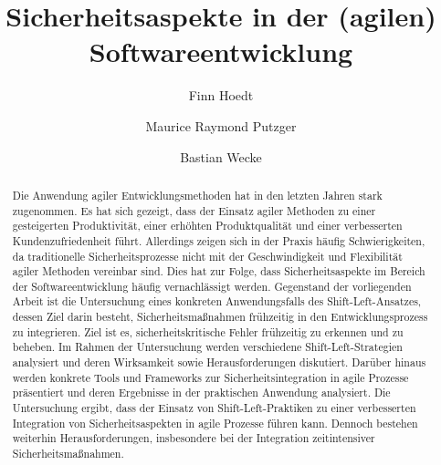 \documentclass[acmtog]{acmart}
\begin{document}
\title{Sicherheitsaspekte in der (agilen) Softwareentwicklung}

\author{Finn Hoedt}
\author{Maurice Raymond Putzger}
\authornotemark[1]
\author{Bastian Wecke}
\authornotemark[1]
\renewcommand{\shortauthors}{Hoedt, Putzger und Wecke}

\begin{abstract}
	Die Anwendung agiler Entwicklungsmethoden hat in den letzten Jahren stark zugenommen. 
	Es hat sich gezeigt, dass der Einsatz agiler Methoden zu einer gesteigerten Produktivität, 
	einer erhöhten Produktqualität und einer verbesserten Kundenzufriedenheit führt. Allerdings zeigen sich in der Praxis häufig Schwierigkeiten, 
	da traditionelle Sicherheitsprozesse nicht mit der Geschwindigkeit und Flexibilität agiler Methoden vereinbar sind. 
	Dies hat zur Folge, dass Sicherheitsaspekte im Bereich der Softwareentwicklung häufig vernachlässigt werden. 
	Gegenstand der vorliegenden Arbeit ist die Untersuchung eines konkreten Anwendungsfalls des Shift-Left-Ansatzes, dessen Ziel darin besteht, 
	Sicherheitsmaßnahmen frühzeitig in den Entwicklungsprozess zu integrieren. Ziel ist es, sicherheitskritische Fehler frühzeitig zu erkennen und zu beheben. 
	Im Rahmen der Untersuchung werden verschiedene Shift-Left-Strategien analysiert und deren Wirksamkeit sowie Herausforderungen diskutiert. 
	Darüber hinaus werden konkrete Tools und Frameworks zur Sicherheitsintegration in agile Prozesse präsentiert und deren Ergebnisse in der praktischen Anwendung analysiert. 
	Die Untersuchung ergibt, dass der Einsatz von Shift-Left-Praktiken zu einer verbesserten Integration von Sicherheitsaspekten in agile Prozesse führen kann. 
	Dennoch bestehen weiterhin Herausforderungen, insbesondere bei der Integration zeitintensiver Sicherheitsmaßnahmen.
	 
\end{abstract}
\end{document}
